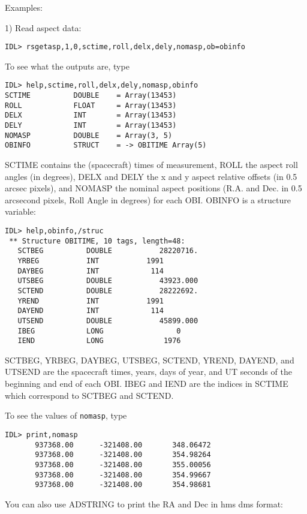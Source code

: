 Examples:
 
1) Read aspect data:

\medskip\noindent
\begin{verbatim}
IDL> rsgetasp,1,0,sctime,roll,delx,dely,nomasp,ob=obinfo
\end{verbatim}
To see what the outputs are, type

\medskip\noindent
\begin{verbatim}
IDL> help,sctime,roll,delx,dely,nomasp,obinfo
SCTIME          DOUBLE    = Array(13453)
ROLL            FLOAT     = Array(13453)
DELX            INT       = Array(13453)
DELY            INT       = Array(13453)
NOMASP          DOUBLE    = Array(3, 5)
OBINFO          STRUCT    = -> OBITIME Array(5)
\end{verbatim}
SCTIME contains the (spacecraft) times of measurement, ROLL the aspect roll
angles (in degrees), DELX and DELY the x and y aspect relative offsets (in 0.5
arcsec pixels), and NOMASP the nominal aspect positions (R.A. and Dec. in 0.5
arcsecond pixels, Roll Angle in degrees) for each OBI. OBINFO is a structure
variable:

\medskip\noindent
\begin{verbatim}
IDL> help,obinfo,/struc
 ** Structure OBITIME, 10 tags, length=48:
   SCTBEG          DOUBLE           28220716.
   YRBEG           INT           1991
   DAYBEG          INT            114
   UTSBEG          DOUBLE           43923.000
   SCTEND          DOUBLE           28222692.
   YREND           INT           1991
   DAYEND          INT            114
   UTSEND          DOUBLE           45899.000
   IBEG            LONG                 0
   IEND            LONG              1976
\end{verbatim}
SCTBEG, YRBEG, DAYBEG, UTSBEG, SCTEND, YREND, DAYEND, and UTSEND are the
spacecraft times, years, days of year, and UT seconds of the beginning and end
of each OBI. IBEG and IEND are the indices in SCTIME which correspond to SCTBEG
and SCTEND.
 
To see the values of {\tt nomasp}, type

\medskip\noindent
\begin{verbatim}
IDL> print,nomasp
       937368.00      -321408.00       348.06472
       937368.00      -321408.00       354.98264
       937368.00      -321408.00       355.00056
       937368.00      -321408.00       354.99667
       937368.00      -321408.00       354.98681
\end{verbatim}
You can also use ADSTRING to print the RA and Dec in hms dms format:

